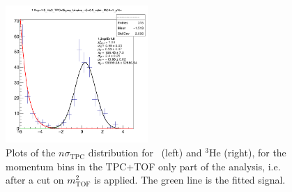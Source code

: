 \begin{figure}
    \includegraphics[width=0.48\textwidth]{figures/Selected_Plots/1.2<p<1.5_He3_TPCnSigma_binsize_nS=0.5_rebin_DCA=1_pVtx.png}
    \caption{Plots of the $n\sigma_{\mathrm{TPC}}$ distribution for \ahe\ (left) and $^3\mathrm{He}$ (right), for the momentum bins in the TPC+TOF only part of the analysis, i.e. after a cut on $m_{\mathrm{TOF}}^2$ is applied. The green line is the fitted signal.}
    \label{fig:he3_TOF_PID}
\end{figure}

